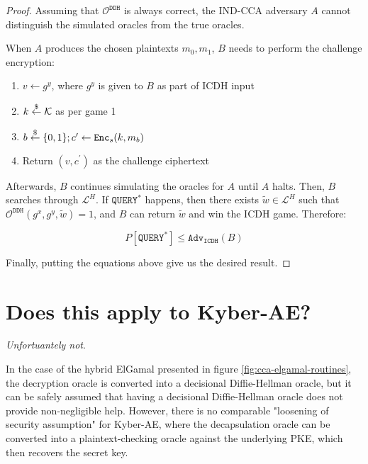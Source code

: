 \documentclass{article}
\begin{document}
\begin{proof}
    Assuming that $\mathcal{O}^\texttt{DDH}$ is always correct, the IND-CCA adversary $A$ cannot distinguish the simulated oracles from the true oracles.

    When $A$ produces the chosen plaintexts $m_0, m_1$, $B$ needs to perform the challenge encryption: \begin{enumerate}
        \item $v \leftarrow g^y$, where $g^y$ is given to $B$ as part of ICDH input
        \item $k \stackrel{\$}{\leftarrow} \mathcal{K}$ as per game 1
        \item $b \stackrel{\$}{\leftarrow} \{0,1\}; c^\prime \leftarrow \texttt{Enc}_s(k, m_b)$
        \item Return $(v, c^\prime)$ as the challenge ciphertext
    \end{enumerate}

    Afterwards, $B$ continues simulating the oracles for $A$ until $A$ halts. Then, $B$ searches through $\mathcal{L}^H$. If $\texttt{QUERY}^\ast$ happens, then there exists $\tilde{w} \in \mathcal{L}^H$ such that $\mathcal{O}^\texttt{DDH}(g^x, g^y, \tilde{w}) = 1$, and $B$ can return $\tilde{w}$ and win the ICDH game. Therefore:

    \begin{equation*}
        P\left\lbrack \texttt{QUERY}^\ast \right\rbrack \leq \texttt{Adv}_\texttt{ICDH}(B)
    \end{equation*}

    Finally, putting the equations above give us the desired result.
\end{proof}

\section{Does this apply to Kyber-AE?}
\emph{Unfortuantely not}.

In the case of the hybrid ElGamal presented in figure \ref{fig:cca-elgamal-routines}, the decryption oracle is converted into a decisional Diffie-Hellman oracle, but it can be safely assumed that having a decisional Diffie-Hellman oracle does not provide non-negligible help. However, there is no comparable "loosening of security assumption" for Kyber-AE, where the decapsulation oracle can be converted into a plaintext-checking oracle against the underlying PKE, which then recovers the secret key.



\end{document}
